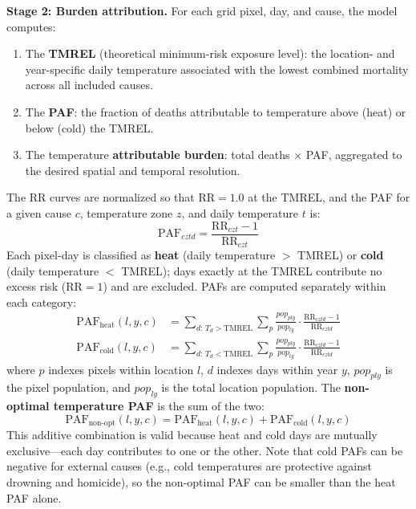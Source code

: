 \documentclass[11pt,a4paper]{article}
\begin{document}
\textbf{Stage 2: Burden attribution.} For each grid pixel, day, and cause, the model computes:
\begin{enumerate}[nosep]
  \item The \textbf{TMREL} (theoretical minimum-risk exposure level): the location- and year-specific daily temperature associated with the lowest combined mortality across all included causes.
  \item The \textbf{PAF}: the fraction of deaths attributable to temperature above (heat) or below (cold) the TMREL.
  \item The temperature \textbf{attributable burden}: total deaths $\times$ PAF, aggregated to the desired spatial and temporal resolution.
\end{enumerate}

The RR curves are normalized so that $\text{RR} = 1.0$ at the TMREL, and the PAF for a given cause $c$, temperature zone $z$, and daily temperature $t$ is:
\begin{equation}
  \text{PAF}_{cztd} = \frac{\text{RR}_{czt} - 1}{\text{RR}_{czt}}
  \label{eq:paf}
\end{equation}
Each pixel-day is classified as \textbf{heat} (daily temperature $>$ TMREL) or \textbf{cold} (daily temperature $<$ TMREL); days exactly at the TMREL contribute no excess risk ($\text{RR} = 1$) and are excluded. PAFs are computed separately within each category:
\begin{align}
  \text{PAF}_{\text{heat}}(l,y,c) &= \sum_{d:\, T_d > \text{TMREL}} \sum_p \frac{pop_{ply}}{pop_{ly}} \cdot \frac{\text{RR}_{cztd} - 1}{\text{RR}_{cztd}} \label{eq:paf_heat}\\[0.3em]
  \text{PAF}_{\text{cold}}(l,y,c) &= \sum_{d:\, T_d < \text{TMREL}} \sum_p \frac{pop_{ply}}{pop_{ly}} \cdot \frac{\text{RR}_{cztd} - 1}{\text{RR}_{cztd}} \label{eq:paf_cold}
\end{align}
where $p$ indexes pixels within location $l$, $d$ indexes days within year $y$, $pop_{ply}$ is the pixel population, and $pop_{ly}$ is the total location population. The \textbf{non-optimal temperature PAF} is the sum of the two:
\begin{equation}
  \text{PAF}_{\text{non-opt}}(l,y,c) = \text{PAF}_{\text{heat}}(l,y,c) + \text{PAF}_{\text{cold}}(l,y,c)
  \label{eq:paf_nonopt}
\end{equation}
This additive combination is valid because heat and cold days are mutually exclusive---each day contributes to one or the other. Note that cold PAFs can be negative for external causes (e.g., cold temperatures are protective against drowning and homicide), so the non-optimal PAF can be smaller than the heat PAF alone.
\end{document}
